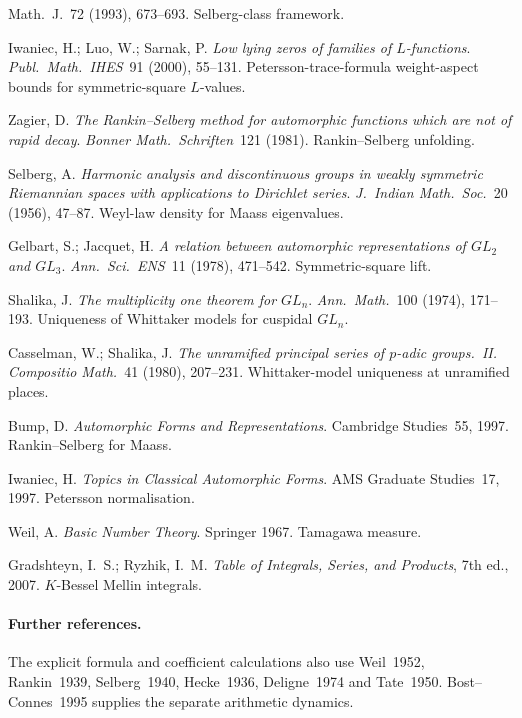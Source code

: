 \begin{description}
{Math.~J.}~72 (1993), 673--693. Selberg-class framework.
\item[Iwaniec--Luo--Sarnak 2000.] Iwaniec, H.; Luo, W.; Sarnak, P.
\emph{Low lying zeros of families of \(L\)-functions}.
\emph{Publ.~Math.~IHES}~91 (2000), 55--131. Petersson-trace-formula
weight-aspect bounds for symmetric-square \(L\)-values.
\item[Zagier 1981.] Zagier, D. \emph{The Rankin--Selberg method for
automorphic functions which are not of rapid decay}.
\emph{Bonner Math.~Schriften}~121 (1981). Rankin--Selberg unfolding.
\item[Selberg 1956.] Selberg, A. \emph{Harmonic analysis and
discontinuous groups in weakly symmetric Riemannian spaces with
applications to Dirichlet series}. \emph{J.~Indian Math.~Soc.}~20
(1956), 47--87. Weyl-law density for Maass eigenvalues.
\item[Gelbart--Jacquet 1978.] Gelbart, S.; Jacquet, H. \emph{A
relation between automorphic representations of \(GL_{2}\) and
\(GL_{3}\)}. \emph{Ann.~Sci.~ENS}~11 (1978), 471--542.
Symmetric-square lift.
\item[Shalika 1974.] Shalika, J. \emph{The multiplicity one theorem
for \(GL_{n}\)}. \emph{Ann.~Math.}~100 (1974), 171--193. Uniqueness of
Whittaker models for cuspidal \(GL_{n}\).
\item[Casselman--Shalika 1980.] Casselman, W.; Shalika, J.
\emph{The unramified principal series of \(p\)-adic groups.~II.}
\emph{Compositio Math.}~41 (1980), 207--231. Whittaker-model
uniqueness at unramified places.
\item[Bump 1997.] Bump, D. \emph{Automorphic Forms and
Representations}. Cambridge Studies~55, 1997. Rankin--Selberg for
Maass.
\item[Iwaniec 1997.] Iwaniec, H. \emph{Topics in Classical Automorphic
Forms}. AMS Graduate Studies~17, 1997. Petersson normalisation.
\item[Weil 1967.] Weil, A. \emph{Basic Number Theory}. Springer 1967.
Tamagawa measure.
\item[Gradshteyn--Ryzhik.] Gradshteyn, I.~S.; Ryzhik, I.~M.
\emph{Table of Integrals, Series, and Products}, 7th ed., 2007.
\(K\)-Bessel Mellin integrals.
\end{description}

\paragraph{Further references.}
The explicit formula and coefficient calculations also use Weil~1952,
Rankin~1939, Selberg~1940, Hecke~1936, Deligne~1974 and Tate~1950.
Bost--Connes~1995 supplies the separate arithmetic dynamics.
